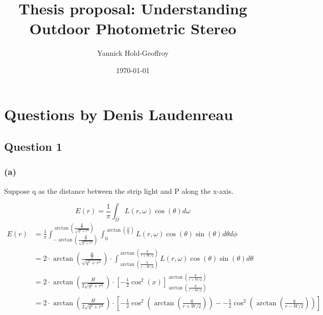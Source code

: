 \documentclass{report}
\title{Thesis proposal: Understanding Outdoor Photometric Stereo}
\author{Yannick Hold-Geoffroy}
\date{\today}
\begin{document}

\maketitle

\tableofcontents

\hypersetup{colorlinks=true,linkcolor=blue}

\newcommand*\B[1]{\mathbf{#1}}
\newcommand{\boldomega}{\boldsymbol \omega} %
\newcommand{\boldmu}{\boldsymbol \mu} %
\newcommand{\bolddelta}{\boldsymbol \delta} %

\newcommand\norm[1]{\left\lVert#1\right\rVert}

\newcommand\todo[1]{\textcolor{red}{TODO: #1}}

\graphicspath{{figures/}}

\chapter{Questions by Denis Laudenreau}

\section*{Question 1}

\subsection{(a)}

Suppose q as the distance between the strip light and P along the x-axis.

\begin{equation}
E(r) = \frac{1}{\pi} \int_{\Omega} L(r,\omega)\cos(\theta) d\omega
\end{equation}
\begin{align*}
E(r) &= \frac{1}{\pi} \int_{-\arctan(\frac{\frac{H}{2}}{\sqrt{q^2+r^2}})}^{\arctan(\frac{\frac{H}{2}}{\sqrt{q^2+r^2}})} \int_{0}^{\arctan(\frac{w}{q})} L(r,\omega)\cos(\theta) \sin(\theta) d\theta d\phi \\
     &= 2 \cdot \arctan(\frac{\frac{H}{2}}{\sqrt{q^2+r^2}}) \cdot \int_{\arctan(\frac{q}{r-W/2})}^{\arctan(\frac{q}{r+W/2})} L(r,\omega)\cos(\theta) \sin(\theta) d\theta \\
     &= 2 \cdot \arctan(\frac{H}{2\sqrt{q^2+r^2}}) \cdot \left[ - \frac{1}{2} \cos^2(x) \right]_{\arctan(\frac{q}{r-W/2})}^{\arctan(\frac{q}{r+W/2})} \\
     &= 2 \cdot \arctan(\frac{H}{2\sqrt{q^2+r^2}}) \cdot \left[ - \frac{1}{2} \cos^2(\arctan(\frac{q}{r+W/2})) - - \frac{1}{2} \cos^2(\arctan(\frac{q}{r-W/2})) \right] \\
\end{align*}
\end{document}
